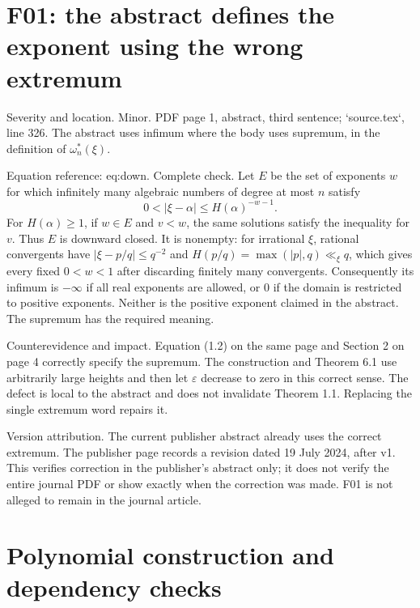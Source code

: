 \documentclass[10pt]{article}
\begin{document}
\section*{F01: the abstract defines the exponent using the wrong extremum}
Severity and location. Minor. PDF page 1, abstract, third sentence; `source.tex`, line 326. The abstract uses infimum where the body uses supremum, in the definition of \(\omega_n^*(\xi)\).\par
Equation reference: eq:down. Complete check. Let \(E\) be the set of exponents \(w\) for which infinitely many algebraic numbers of degree at most \(n\) satisfy \[
 0<|\xi-\alpha|\le H(\alpha)^{-w-1}.\] For \(H(\alpha)\ge1\), if \(w\in E\) and \(v<w\), the same solutions satisfy the inequality for \(v\). Thus \(E\) is downward closed. It is nonempty: for irrational \(\xi\), rational convergents have \(|\xi-p/q|\le q^{-2}\) and \(H(p/q)=\max(|p|,q)\ll_\xi q\), which gives every fixed \(0<w<1\) after discarding finitely many convergents. Consequently its infimum is \(-\infty\) if all real exponents are allowed, or \(0\) if the domain is restricted to positive exponents. Neither is the positive exponent claimed in the abstract. The supremum has the required meaning.\par
Counterevidence and impact. Equation (1.2) on the same page and Section 2 on page 4 correctly specify the supremum. The construction and Theorem 6.1 use arbitrarily large heights and then let \(\varepsilon\) decrease to zero in this correct sense. The defect is local to the abstract and does not invalidate Theorem 1.1. Replacing the single extremum word repairs it.\par
Version attribution. The current publisher abstract already uses the correct extremum. The publisher page records a revision dated 19 July 2024, after v1. This verifies correction in the publisher’s abstract only; it does not verify the entire journal PDF or show exactly when the correction was made. F01 is not alleged to remain in the journal article.\par
\section*{Polynomial construction and dependency checks}
\end{document}
